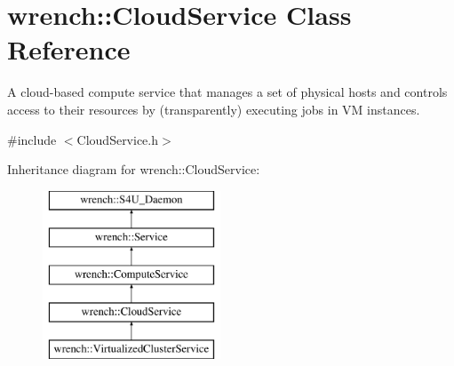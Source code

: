 \hypertarget{classwrench_1_1_cloud_service}{}\section{wrench\+:\+:Cloud\+Service Class Reference}
\label{classwrench_1_1_cloud_service}


A cloud-\/based compute service that manages a set of physical hosts and controls access to their resources by (transparently) executing jobs in VM instances.  




{\ttfamily \#include $<$Cloud\+Service.\+h$>$}

Inheritance diagram for wrench\+:\+:Cloud\+Service\+:\begin{figure}[H]
\begin{center}
\leavevmode
\includegraphics[height=5.000000cm]{classwrench_1_1_cloud_service}
\end{center}
\end{figure}
